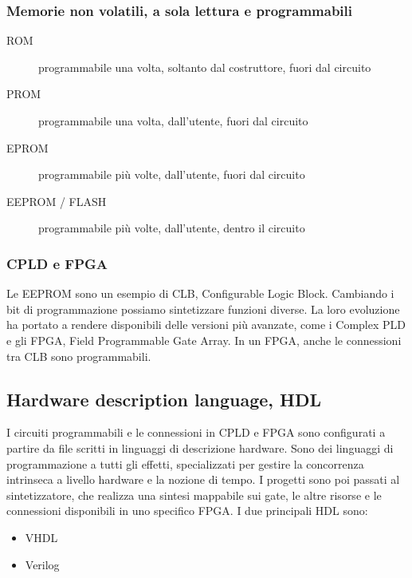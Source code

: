 \documentclass{subfiles}
\begin{document}
\subsubsection{Memorie non volatili, a sola lettura e programmabili}

\begin{description}
    \item[ROM] programmabile una volta, soltanto dal costruttore, fuori dal circuito
    \item[PROM] programmabile una volta, dall'utente, fuori dal circuito
    \item[EPROM] programmabile più volte, dall'utente, fuori dal circuito
    \item[EEPROM / FLASH] programmabile più volte, dall'utente, dentro il circuito
\end{description}

\subsubsection{CPLD e FPGA}

Le EEPROM sono un esempio di CLB, Configurable Logic Block.
Cambiando i bit di programmazione possiamo sintetizzare funzioni diverse.
La loro evoluzione ha portato a rendere disponibili delle versioni più avanzate, come i Complex PLD e gli FPGA, Field Programmable Gate Array.
In un FPGA, anche le connessioni tra CLB sono programmabili.

\subsection{Hardware description language, HDL}

I circuiti programmabili e le connessioni in CPLD e FPGA sono configurati a partire da file scritti in linguaggi di descrizione hardware.
Sono dei linguaggi di programmazione a tutti gli effetti, specializzati per gestire la concorrenza intrinseca a livello hardware e la nozione di tempo.
I progetti sono poi passati al sintetizzatore, che realizza una sintesi mappabile sui gate, le altre risorse e le connessioni disponibili in uno specifico FPGA.
I due principali HDL sono:

\begin{itemize}
    \item VHDL
    \item Verilog
\end{itemize}
\end{document}
